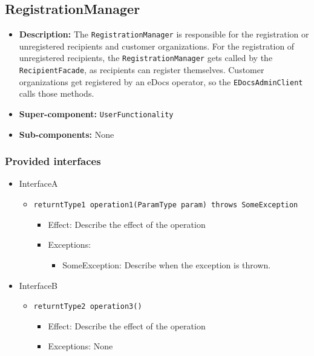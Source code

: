 \documentclass[a4paper,10pt]{article}
\begin{document}
\subsection{RegistrationManager}
\begin{itemize}
    \item \textbf{Description:} The \texttt{RegistrationManager} is responsible for the registration or unregistered recipients and customer organizations. For the registration of unregistered recipients, the \texttt{RegistrationManager} gets called by the \texttt{RecipientFacade}, as recipients can register themselves. Customer organizations get registered by an eDocs operator, so the \texttt{EDocsAdminClient} calls those methods.
    \item \textbf{Super-component:} \texttt{UserFunctionality}
    \item \textbf{Sub-components:} None
\end{itemize}

\subsubsection*{Provided interfaces}
\begin{itemize}
    \item InterfaceA
    \begin{itemize}
        \item \texttt{returntType1 operation1(ParamType param) throws SomeException}
        \begin{itemize}
            \item Effect: Describe the effect of the operation
            \item Exceptions:
            \begin{itemize}
                \item SomeException: Describe when the exception is thrown.
            \end{itemize}
        \end{itemize}
    \end{itemize}

    \item InterfaceB
    \begin{itemize}
        \item \texttt{returntType2 operation3()}
        \begin{itemize}
            \item Effect: Describe the effect of the operation
            \item Exceptions: None
        \end{itemize}
    \end{itemize}
\end{itemize}
\end{document}
